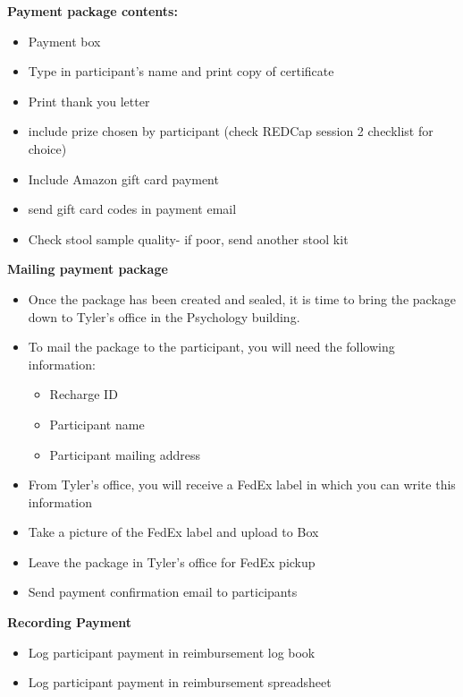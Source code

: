 \documentclass[]{book}
\providecommand{\tightlist}{%
  \setlength{\itemsep}{0pt}\setlength{\parskip}{0pt}}
\begin{document}
\textbf{Payment package contents:}

\begin{itemize}
\tightlist
\item
  Payment box
\item
  Type in participant's name and print copy of certificate
\item
  Print thank you letter
\item
  include prize chosen by participant (check REDCap session 2 checklist for choice)
\item
  Include Amazon gift card payment
\item
  send gift card codes in payment email
\item
  Check stool sample quality- if poor, send another stool kit
\end{itemize}

\textbf{Mailing payment package}

\begin{itemize}
\tightlist
\item
  Once the package has been created and sealed, it is time to bring the package down to Tyler's office in the Psychology building.
\item
  To mail the package to the participant, you will need the following information:

  \begin{itemize}
  \tightlist
  \item
    Recharge ID
  \item
    Participant name
  \item
    Participant mailing address
  \end{itemize}
\item
  From Tyler's office, you will receive a FedEx label in which you can write this information
\item
  Take a picture of the FedEx label and upload to Box
\item
  Leave the package in Tyler's office for FedEx pickup
\item
  Send payment confirmation email to participants
\end{itemize}

\textbf{Recording Payment}

\begin{itemize}
\tightlist
\item
  Log participant payment in reimbursement log book
\item
  Log participant payment in reimbursement spreadsheet
\end{itemize}
\end{document}
